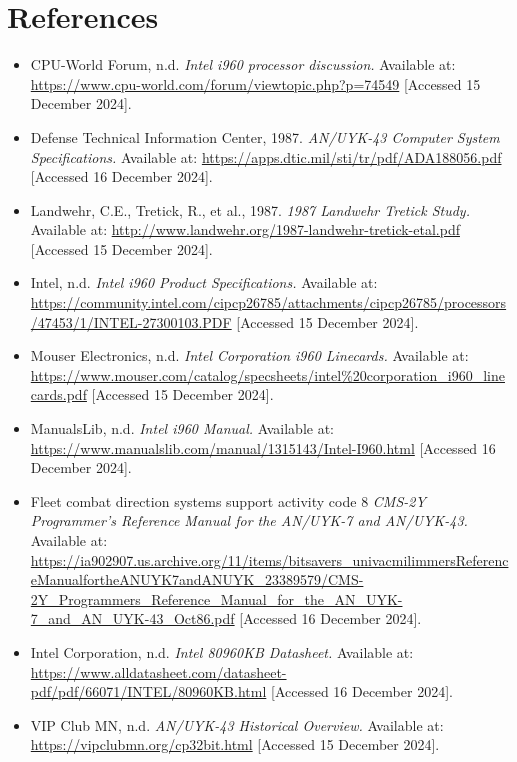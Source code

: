 \documentclass{article}
\begin{document}
\section{References}
\begin{itemize}
\item CPU-World Forum, n.d. \textit{Intel i960 processor discussion.} Available at: \url{https://www.cpu-world.com/forum/viewtopic.php?p=74549} [Accessed 15 December 2024].
\item Defense Technical Information Center, 1987. \textit{AN/UYK-43 Computer System Specifications.} Available at: \url{https://apps.dtic.mil/sti/tr/pdf/ADA188056.pdf} [Accessed 16 December 2024].

\item Landwehr, C.E., Tretick, R., et al., 1987. \textit{1987 Landwehr Tretick Study.} Available at: \url{http://www.landwehr.org/1987-landwehr-tretick-etal.pdf} [Accessed 15 December 2024].

\item Intel, n.d. \textit{Intel i960 Product Specifications.} Available at: \url{https://community.intel.com/cipcp26785/attachments/cipcp26785/processors/47453/1/INTEL-27300103.PDF} [Accessed 15 December 2024].

\item Mouser Electronics, n.d. \textit{Intel Corporation i960 Linecards.} Available at: \url{https://www.mouser.com/catalog/specsheets/intel%20corporation_i960_linecards.pdf} [Accessed 15 December 2024].

\item ManualsLib, n.d. \textit{Intel i960 Manual.} Available at: \url{https://www.manualslib.com/manual/1315143/Intel-I960.html} [Accessed 16 December 2024].

\item Fleet combat direction systems support activity code 8 \textit{CMS-2Y Programmer's Reference Manual for the AN/UYK-7 and AN/UYK-43.} Available at: \url{https://ia902907.us.archive.org/11/items/bitsavers_univacmilimmersReferenceManualfortheANUYK7andANUYK_23389579/CMS-2Y_Programmers_Reference_Manual_for_the_AN_UYK-7_and_AN_UYK-43_Oct86.pdf} [Accessed 16 December 2024].

\item Intel Corporation, n.d. \textit{Intel 80960KB Datasheet.} Available at: \url{https://www.alldatasheet.com/datasheet-pdf/pdf/66071/INTEL/80960KB.html} [Accessed 16 December 2024].


\item VIP Club MN, n.d. \textit{AN/UYK-43 Historical Overview.} Available at: \url{https://vipclubmn.org/cp32bit.html} [Accessed 15 December 2024].


\end{itemize}
\end{document}
